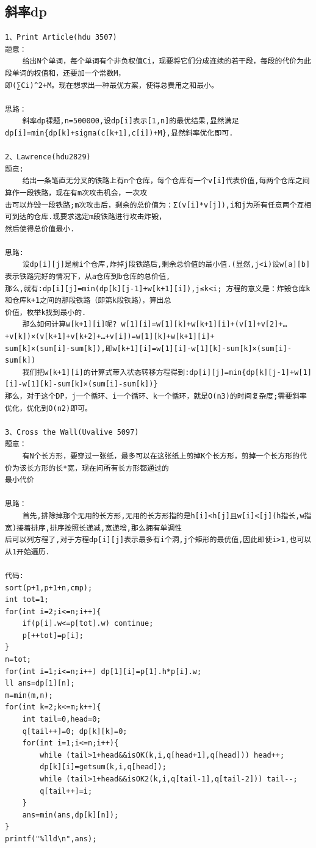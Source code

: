\documentclass[twoside]{article}
\begin{document}
\subsection{斜率dp}
\begin{lstlisting}
1、Print Article(hdu 3507)
题意：
    给出N个单词，每个单词有个非负权值Ci，现要将它们分成连续的若干段，每段的代价为此段单词的权值和，还要加一个常数M，
即(∑Ci)^2+M。现在想求出一种最优方案，使得总费用之和最小。

思路：
    斜率dp裸题,n=500000,设dp[i]表示[1,n]的最优结果,显然满足dp[i]=min{dp[k]+sigma(c[k+1],c[i])+M},显然斜率优化即可.

2、Lawrence(hdu2829)
题意:
    给出一条笔直无分叉的铁路上有n个仓库，每个仓库有一个v[i]代表价值,每两个仓库之间算作一段铁路，现在有m次攻击机会，一次攻
击可以炸毁一段铁路;m次攻击后，剩余的总价值为：Σ(v[i]*v[j]),i和j为所有任意两个互相可到达的仓库.现要求选定m段铁路进行攻击炸毁，
然后使得总价值最小.

思路:
    设dp[i][j]是前i个仓库,炸掉j段铁路后,剩余总价值的最小值.(显然,j<i)设w[a][b]表示铁路完好的情况下，从a仓库到b仓库的总价值,
那么,就有:dp[i][j]=min(dp[k][j-1]+w[k+1][i]),j≤k<i; 方程的意义是：炸毁仓库k和仓库k+1之间的那段铁路（即第k段铁路），算出总
价值，枚举k找到最小的.
    那么如何计算w[k+1][i]呢? w[1][i]=w[1][k]+w[k+1][i]+(v[1]+v[2]+…+v[k])×(v[k+1]+v[k+2]+…+v[i])=w[1][k]+w[k+1][i]+
sum[k]×(sum[i]-sum[k]),即w[k+1][i]=w[1][i]-w[1][k]-sum[k]×(sum[i]-sum[k])
    我们把w[k+1][i]的计算式带入状态转移方程得到:dp[i][j]=min{dp[k][j-1]+w[1][i]-w[1][k]-sum[k]×(sum[i]-sum[k])}
那么，对于这个DP，j一个循环、i一个循环、k一个循环，就是O(n3)的时间复杂度;需要斜率优化，优化到O(n2)即可。

3、Cross the Wall(Uvalive 5097)
题意：
    有N个长方形，要穿过一张纸，最多可以在这张纸上剪掉K个长方形，剪掉一个长方形的代价为该长方形的长*宽，现在问所有长方形都通过的
最小代价

思路：
    首先,排除掉那个无用的长方形,无用的长方形指的是h[i]<h[j]且w[i]<[j](h指长,w指宽)接着排序,排序按照长递减,宽递增,那么拥有单调性
后可以列方程了,对于方程dp[i][j]表示最多有i个洞,j个矩形的最优值,因此即使i>1,也可以从1开始遍历.

代码:
sort(p+1,p+1+n,cmp);
int tot=1;
for(int i=2;i<=n;i++){
    if(p[i].w<=p[tot].w) continue;
    p[++tot]=p[i];
}
n=tot;
for(int i=1;i<=n;i++) dp[1][i]=p[1].h*p[i].w;
ll ans=dp[1][n];
m=min(m,n);
for(int k=2;k<=m;k++){
    int tail=0,head=0;
    q[tail++]=0; dp[k][k]=0;
    for(int i=1;i<=n;i++){
        while (tail>1+head&&isOK(k,i,q[head+1],q[head])) head++;
        dp[k][i]=getsum(k,i,q[head]);
        while (tail>1+head&&isOK2(k,i,q[tail-1],q[tail-2])) tail--;
        q[tail++]=i;
    }
    ans=min(ans,dp[k][n]);
}
printf("%lld\n",ans);


\end{lstlisting}
\end{document}
